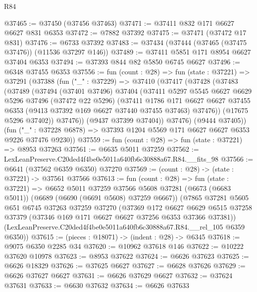 \begin{lexlean}{R84}
\begin{coremodule}
@37465 := @37450 (@37456 @37463)
@37471 := @37411 @832 @171 @6627 @6627 @831 @6353
@37472 := @7882 @37392
@37475 := @37471 (@37472 @17 @831)
@37476 := @6733 @37392
@37483 := @37434 (@37444 (@37465 (@37475 @37476)) (@11536 @37297 @146))
@37489 := @37411 @5851 @171 @8954 @6627 @37404 @6353
@37494 := @37393 @844 @82 @5850 @6745 @6627
@37496 := @6348 @37455 @6353
@37556 := fun (count : @28) =>
  fun (state : @37221) =>
  @37291
    (@37388
      (fun ("_" : @37229) =>
      @37410
        (@37417
          (@37428
            (@37483
              (@37489
                (@37494
                  (@37401 @37496)
                  @37404
                  (@37411
                    @5297
                    @5545
                    @6627
                    @6629
                    @5296
                    @37496
                    (@37472 @22 @5296)
                    (@37411
                      @1786
                      @171
                      @6627
                      @6627
                      @37455
                      @6353
                      (@9413 @37392 @169 @6627 @37440 @37455 @37463)
                      @37476))
                  (@17675 @5296 @37402))
                @37476))
            (@9437 @37399 @37404))
          @37476)
        (@9444 @37405))
      (fun ("_" : @37228 @6878) => @37393 @1204 @5569 @171 @6627 @6627 @6353 @9226 @37476 @9230))
@37559 := fun (count : @28) => fun (state : @37221) => @8953 @37263
@37561 := @6635 @5011 @37259
@37562 := LexLeanPreserve.C20ded4f4be0e5011a640fb6c30888a67.R84.__fits_98
@37566 := @6641 (@37562 @6359 @6350) @37270
@37569 := (count : @28) -> (state : @37221) -> @37561 @37566
@37613 := fun (count : @28) =>
  fun (state : @37221) =>
  @6652
    @5011
    @37259
    @37566
    @5608
    @37281
    (@6673 (@6683 @5011))
    (@6689 (@6690 (@6691 @5608) @37259 @6667))
    (@7865
      @37281
      @5605
      @651
      @6745
      @37263
      @37259
      @37270
      (@37369
        @172
        @6627
        @6629
        @6515
        @37258
        @37379
        (@37346 @169 @171 @6627 @6627 @37256 @6353 @37366 @37381))
      (LexLeanPreserve.C20ded4f4be0e5011a640fb6c30888a67.R84.__rel_105 @6359 @6350))
@37615 := (pieces : @18071) -> (indent : @28) -> @6345
@37618 := @9075 @6350 @2285 @34
@37620 := @10962 @37618 @146
@37622 := @10222 @37620 @10978
@37623 := @8953 @37622
@37624 := @6626 @37623
@37625 := @6626 @18329
@37626 := @37625 @6627
@37627 := @6628 @37626
@37629 := @6626 @37627 @6627
@37631 := @6626 @37629 @6627
@37632 := @37624 @37631
@37633 := @6630 @37632
@37634 := @6626 @37633

\end{coremodule}
\end{lexlean}
